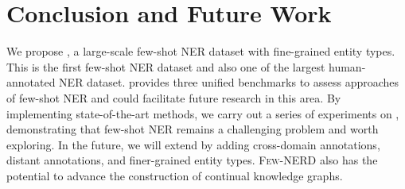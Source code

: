 \documentclass[11pt,a4paper, dvipsnames]{article}
\begin{document}
\begin{table}[]
\centering
{}
\caption{Error analysis of 5 way 510 shot on , ``Within'' indicates ``within the coarse types'' and ``Outer'' is ``outer the coarse types''.}
\vspace{-0.2cm}
\label{tab:error}

\end{table}



















\section{Conclusion and Future Work}


We propose , a large-scale few-shot NER dataset with fine-grained entity types. This is the first few-shot NER dataset and also one of the largest human-annotated NER dataset.  provides three unified benchmarks to assess approaches of few-shot NER and could facilitate future research in this area. 
By implementing state-of-the-art methods, we carry out 
a series of experiments on , demonstrating that few-shot NER remains a challenging problem and worth exploring. 
In the future, we will extend  by adding cross-domain annotations, distant annotations, and finer-grained entity types. \textsc{Few-NERD} also has the potential to advance the construction of continual knowledge graphs. 
\end{document}
